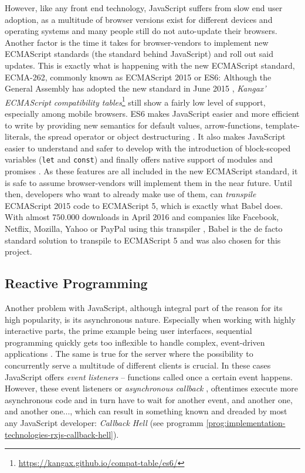 However, like any front end technology, JavaScript suffers from slow end user adoption, as a multitude of browser versions exist for different devices and operating systems and many people still do not auto-update their browsers. Another factor is the time it takes for browser-vendors to implement new ECMAScript standards (the standard behind JavaScript) and roll out said updates. This is exactly what is happening with the new ECMAScript standard, ECMA-262, commonly known as ECMAScript 2015 or ES6: Although the General Assembly has adopted the new standard in June 2015 \cite{ecma2015}, \emph{Kangax' ECMAScript compatibility tables}\footnote{\url{https://kangax.github.io/compat-table/es6/}} still show a fairly low level of support, especially among mobile browsers. ES6 makes JavaScript easier and more efficient to write by providing new semantics for default values, arrow-functions, template-literals, the spread operator or object destructuring \cite{es6}. It also makes JavaScript easier to understand and safer to develop with the introduction of block-scoped variables (\texttt{let} and \texttt{const}) and finally offers native support of modules and promises \cite{es6}.
As these features are all included in the new ECMAScript standard, it is safe to assume browser-vendors will implement them in the near future. Until then, developers who want to already make use of them, can \emph{transpile} ECMAScript 2015 code to ECMAScript 5, which is exactly what Babel does. With almost $750.000$ downloads in April 2016 \cite{npm-babel} and companies like Facebook, Netflix, Mozilla, Yahoo or PayPal using this transpiler \cite{babel-users}, Babel is the de facto standard solution to transpile to ECMAScript 5 and was also chosen for this project.

\subsection{Reactive Programming}
\label{sec:implementation-technologies-rxjs}

Another problem with JavaScript, although integral part of the reason for its high popularity, is its asynchronous nature. Especially when working with highly interactive parts, the prime example being user interfaces, sequential programming quickly gets too inflexible to handle complex, event-driven applications \cite{reactive-programming-survey}. The same is true for the server where the possibility to concurrently serve a multitude of different clients is crucial. In these cases JavaScript offers \emph{event listeners} -- functions called once a certain event happens. However, these event listeners or \emph{asynchronous callback} \cite{reactive-programming-survey}, oftentimes execute more asynchronous code and in turn have to wait for another event, and another one, and another one..., which can result in something known and dreaded by most any JavaScript developer: \emph{Callback Hell} (see programm \ref{prog:implementation-technologies-rxjs-callback-hell}).

